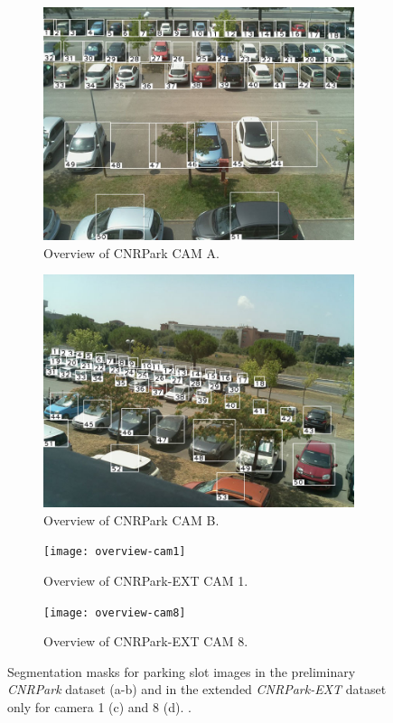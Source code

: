 \begin{figure}
\centering
\begin{subfigure}[b]{0.49\columnwidth}
	\includegraphics[width=\columnwidth]{camera-a-overview}
	\caption{Overview of CNRPark CAM A.}
	\label{fig:mini:cam-a}
\end{subfigure} %
\begin{subfigure}[b]{0.49\columnwidth}
	\includegraphics[width=\columnwidth]{camera-b-overview}
	\caption{Overview of CNRPark CAM B.}
	\label{fig:mini:cam-b}
\end{subfigure}

\begin{subfigure}[b]{0.49\columnwidth}
	\texttt{[image: overview-cam1]}
	\caption{Overview of CNRPark-EXT CAM 1.}
	\label{fig:mini:cam-1}
\end{subfigure} %
\begin{subfigure}[b]{0.49\columnwidth}
	\texttt{[image: overview-cam8]}
	\caption{Overview of CNRPark-EXT CAM 8.}
	\label{fig:mini:cam-8}
\end{subfigure}
\caption{Segmentation masks for parking slot images in the preliminary \emph{CNRPark} dataset (a-b) and in the extended \emph{CNRPark-EXT} dataset only for camera 1 (c) and 8 (d).
.}
\label{fig:mini:cam-overview}
\end{figure}


